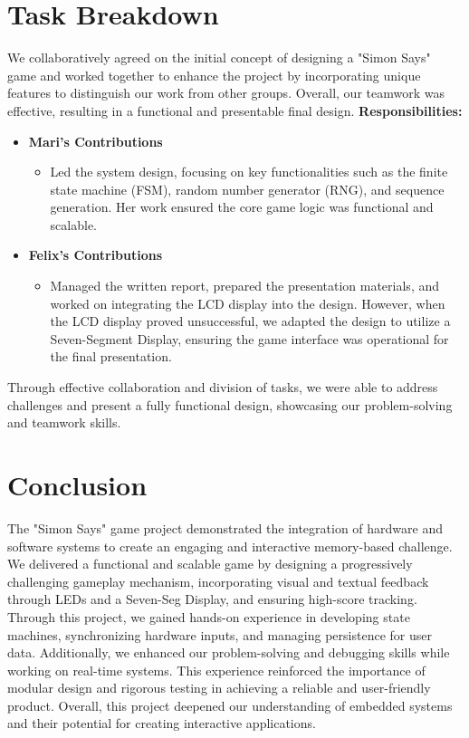 \documentclass{report}
\begin{document}
\chapter{Task Breakdown}
We collaboratively agreed on the initial concept of designing a "Simon Says" game and worked together to enhance the project by incorporating unique features to distinguish our work from other groups. Overall, our teamwork was effective, resulting in a functional and presentable final design. \newline
\textbf{Responsibilities:}
\begin{itemize}
    \item \textbf{Mari's Contributions}
    \begin{itemize}
        \item Led the system design, focusing on key functionalities such as the finite state machine (FSM), random number generator (RNG), and sequence generation. Her work ensured the core game logic was functional and scalable.
    \end{itemize}
    \item \textbf{Felix's Contributions}
    \begin{itemize}
        \item Managed the written report, prepared the presentation materials, and worked on integrating the LCD display into the design. However, when the LCD display proved unsuccessful, we adapted the design to utilize a Seven-Segment Display, ensuring the game interface was operational for the final presentation.
    \end{itemize}
\end{itemize}
Through effective collaboration and division of tasks, we were able to address challenges and present a fully functional design, showcasing our problem-solving and teamwork skills.
\chapter{Conclusion}
The "Simon Says" game project demonstrated the integration of hardware and software systems to create an engaging and interactive memory-based challenge. We delivered a functional and scalable game by designing a progressively challenging gameplay mechanism, incorporating visual and textual feedback through LEDs and a Seven-Seg Display, and ensuring high-score tracking.
Through this project, we gained hands-on experience in developing state machines, synchronizing hardware inputs, and managing persistence for user data. Additionally, we enhanced our problem-solving and debugging skills while working on real-time systems. This experience reinforced the importance of modular design and rigorous testing in achieving a reliable and user-friendly product. Overall, this project deepened our understanding of embedded systems and their potential for creating interactive applications.
\end{document}
